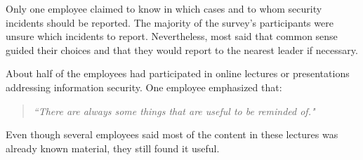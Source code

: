 Only one employee claimed to know in which cases and to whom security incidents should be reported. The majority of the survey's participants were unsure which incidents to report. Nevertheless, most said that common sense guided their choices and that they would report to the nearest leader if necessary.

About half of the employees had participated in online lectures or presentations addressing information security. One employee emphasized that:

\begin{quote}
\textit{``There are always some things that are useful to be reminded of."}
\end{quote}

Even though several employees said most of the content in these lectures was already known material, they still found it useful.